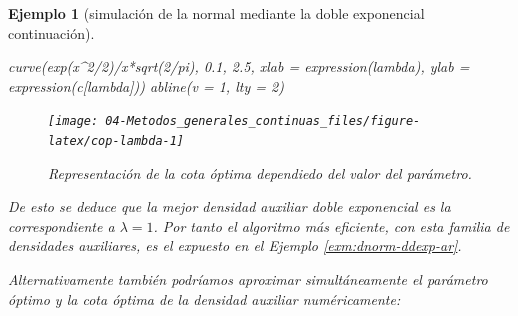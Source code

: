 \documentclass[
]{book}
\newenvironment{Shaded}{\begin{snugshade}}{\end{snugshade}}
\newcommand{\AttributeTok}[1]{\textcolor[rgb]{0.77,0.63,0.00}{#1}}
\newcommand{\CommentTok}[1]{\textcolor[rgb]{0.56,0.35,0.01}{\textit{#1}}}
\newcommand{\ConstantTok}[1]{\textcolor[rgb]{0.00,0.00,0.00}{#1}}
\newcommand{\ControlFlowTok}[1]{\textcolor[rgb]{0.13,0.29,0.53}{\textbf{#1}}}
\newcommand{\DecValTok}[1]{\textcolor[rgb]{0.00,0.00,0.81}{#1}}
\newcommand{\FloatTok}[1]{\textcolor[rgb]{0.00,0.00,0.81}{#1}}
\newcommand{\FunctionTok}[1]{\textcolor[rgb]{0.00,0.00,0.00}{#1}}
\newcommand{\NormalTok}[1]{#1}
\newcommand{\OtherTok}[1]{\textcolor[rgb]{0.56,0.35,0.01}{#1}}
\newcommand{\SpecialCharTok}[1]{\textcolor[rgb]{0.00,0.00,0.00}{#1}}
\theoremstyle{break}
\newtheorem{example}{Ejemplo}[chapter]
\theoremstyle{nonumberplain}
\begin{document}
\begin{example}[simulación de la normal mediante la doble exponencial continuación]
\begin{Shaded}
\begin{Highlighting}[]
\FunctionTok{curve}\NormalTok{(}\FunctionTok{exp}\NormalTok{(x}\SpecialCharTok{\^{}}\DecValTok{2}\SpecialCharTok{/}\DecValTok{2}\NormalTok{)}\SpecialCharTok{/}\NormalTok{x}\SpecialCharTok{*}\FunctionTok{sqrt}\NormalTok{(}\DecValTok{2}\SpecialCharTok{/}\NormalTok{pi), }\FloatTok{0.1}\NormalTok{, }\FloatTok{2.5}\NormalTok{,}
       \AttributeTok{xlab =} \FunctionTok{expression}\NormalTok{(lambda), }\AttributeTok{ylab =} \FunctionTok{expression}\NormalTok{(c[lambda]))}
\FunctionTok{abline}\NormalTok{(}\AttributeTok{v =} \DecValTok{1}\NormalTok{, }\AttributeTok{lty =} \DecValTok{2}\NormalTok{)}
\end{Highlighting}
\end{Shaded}

\begin{figure}[!htb]

{\centering \texttt{[image: 04-Metodos\_generales\_continuas\_files/figure-latex/cop-lambda-1]} 

}

\caption{Representación de la cota óptima dependiedo del valor del parámetro.}\label{fig:cop-lambda}
\end{figure}

De esto se deduce que la mejor densidad auxiliar doble exponencial es la correspondiente a \(\lambda=1\).
Por tanto el algoritmo más eficiente, con esta familia de densidades auxiliares, es el expuesto en el Ejemplo \ref{exm:dnorm-ddexp-ar}.

Alternativamente también podríamos aproximar simultáneamente el parámetro óptimo y la cota óptima de la densidad auxiliar numéricamente:

\begin{Shaded}
\end{Shaded}


\end{example}
\end{document}

